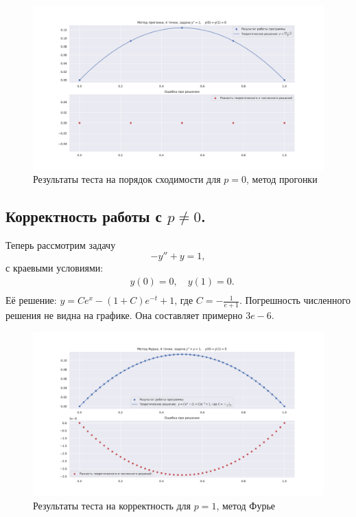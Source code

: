 \documentclass[14pt,a4paper]{extarticle}
\newcommand{\1}{\mathbbm{1}}
\begin{document}
\begin{figure}
    \centering
    \includegraphics[scale=0.4]{figs/s4p0f1.pdf}
    \caption{Результаты теста на порядок сходимости для $p=0$, метод прогонки}
\end{figure}

\subsection{Корректность работы с $p\neq0$.}
Теперь рассмотрим задачу
\begin{equation*} \label{diffeq1}
    -y'' + y = 1,
\end{equation*}
с краевыми условиями:
\begin{align*} \label{diffeqedge}
    & y(0) = 0, \quad y(1) = 0. \\
\end{align*}
Её решение: $y = C e^x - (1 + C) e^{-t} + 1$, где $C = -\frac{1}{e + 1}$. Погрешность численного решения не видна на графике. Она составляет примерно $3e-6$.
\begin{figure}
    \centering
    \includegraphics[scale=0.4]{figs/f50p1f1.pdf}
    \caption{Результаты теста на корректность для $p=1$, метод Фурье}
\end{figure}
\end{document}
